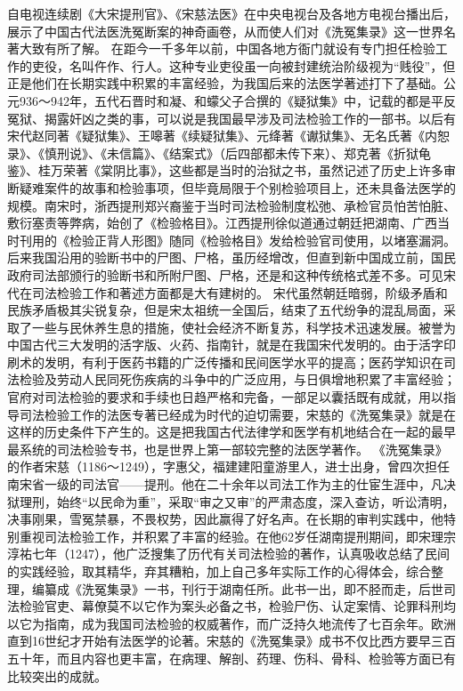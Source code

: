 \documentclass[12pt,UTF8]{ctexbook}
\begin{document}
自电视连续剧《大宋提刑官》、《宋慈法医》在中央电视台及各地方电视台播出后，展示了中国古代法医洗冤断案的神奇画卷，从而使人们对《洗冤集录》这一世界名著大致有所了解。
在距今一千多年以前，中国各地方衙门就设有专门担任检验工作的吏役，名叫仵作、行人。这种专业吏役虽一向被封建统治阶级视为“贱役”，但正是他们在长期实践中积累的丰富经验，为我国后来的法医学著述打下了基础。公元936～942年，五代石晋时和凝、和蠓父子合撰的《疑狱集》中，记载的都是平反冤狱、揭露奸凶之类的事，可以说是我国最早涉及司法检验工作的一部书。以后有宋代赵同著《疑狱集》、王嗥著《续疑狱集》、元绛著《谳狱集》、无名氏著《内恕录》、《慎刑说》、《未信篇》、《结案式》（后四部都未传下来）、郑克著《折狱龟鉴》、桂万荣著《棠阴比事》，这些都是当时的治狱之书，虽然记述了历史上许多审断疑难案件的故事和检验事项，但毕竟局限于个别检验项目上，还未具备法医学的规模。南宋时，浙西提刑郑兴裔鉴于当时司法检验制度松弛、承检官员怕苦怕脏、敷衍塞责等弊病，始创了《检验格目》。江西提刑徐似道通过朝廷把湖南、广西当时刊用的《检验正背人形图》随同《检验格目》发给检验官司使用，以堵塞漏洞。后来我国沿用的验断书中的尸图、尸格，虽历经增改，但直到新中国成立前，国民政府司法部颁行的验断书和所附尸图、尸格，还是和这种传统格式差不多。可见宋代在司法检验工作和著述方面都是大有建树的。
宋代虽然朝廷暗弱，阶级矛盾和民族矛盾极其尖锐复杂，但是宋太祖统一全国后，结束了五代纷争的混乱局面，采取了一些与民休养生息的措施，使社会经济不断复苏，科学技术迅速发展。被誉为中国古代三大发明的活字版、火药、指南针，就是在我国宋代发明的。由于活字印刷术的发明，有利于医药书籍的广泛传播和民间医学水平的提高；医药学知识在司法检验及劳动人民同死伤疾病的斗争中的广泛应用，与日俱增地积累了丰富经验；官府对司法检验的要求和手续也日趋严格和完备，一部足以囊括既有成就，用以指导司法检验工作的法医专著已经成为时代的迫切需要，宋慈的《洗冤集录》就是在这样的历史条件下产生的。这是把我国古代法律学和医学有机地结合在一起的最早最系统的司法检验专书，也是世界上第一部较完整的法医学著作。
《洗冤集录》的作者宋慈（1186～1249），字惠父，福建建阳童游里人，进士出身，曾四次担任南宋省一级的司法官——提刑。他在二十余年以司法工作为主的仕宦生涯中，凡决狱理刑，始终“以民命为重”，采取“审之又审”的严肃态度，深入查访，听讼清明，决事刚果，雪冤禁暴，不畏权势，因此赢得了好名声。在长期的审判实践中，他特别重视司法检验工作，并积累了丰富的经验。在他62岁任湖南提刑期间，即宋理宗淳祐七年（1247），他广泛搜集了历代有关司法检验的著作，认真吸收总结了民间的实践经验，取其精华，弃其糟粕，加上自己多年实际工作的心得体会，综合整理，编纂成《洗冤集录》一书，刊行于湖南任所。此书一出，即不胫而走，后世司法检验官吏、幕僚莫不以它作为案头必备之书，检验尸伤、认定案情、论罪科刑均以它为指南，成为我国司法检验的权威著作，而广泛持久地流传了七百余年。欧洲直到16世纪才开始有法医学的论著。宋慈的《洗冤集录》成书不仅比西方要早三百五十年，而且内容也更丰富，在病理、解剖、药理、伤科、骨科、检验等方面已有比较突出的成就。
\end{document}
